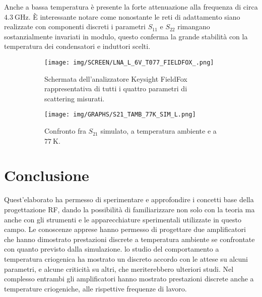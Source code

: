 \documentclass[12pt,oneside]{book}
\begin{document}
Anche a bassa temperatura è presente la forte attenuazione alla frequenza di circa $\SI{4.3}{\giga\hertz}$. È interessante notare come nonostante le reti di adattamento siano realizzate con componenti discreti i parametri $S_{11}$ e $S_{22}$ rimangano sostanzialmente invariati in modulo, questo conferma la grande stabilità con la temperatura dei condensatori e induttori scelti.

\begin{figure}[!htbp]
    \centering
    \begin{subfigure}[t]{0.48\textwidth}
        \centering
        \texttt{[image: img/SCREEN/LNA\_L\_6V\_T077\_FIELDFOX\_.png]}
        \caption{Schermata dell'analizzatore Keysight FieldFox rappresentativa di tutti i quattro parametri di scattering misurati.}
    \end{subfigure}
    \hfill
    \begin{subfigure}[t]{0.48\textwidth}
        \centering
        \texttt{[image: img/GRAPHS/S21\_TAMB\_77K\_SIM\_L.png]}
        \caption{Confronto fra $S_{21}$ simulato, a temperatura ambiente e a $\SI{77}{\kelvin}$.}
    \end{subfigure}
    \caption{}
    \label{cryo_l}
\end{figure}


\chapter{Conclusione}
Quest'elaborato ha permesso di sperimentare e approfondire i concetti base della progettazione RF, dando la possibilità di familiarizzare non solo con la teoria ma anche con gli strumenti e le apparecchiature sperimentali utilizzate in questo campo.
Le conoscenze apprese hanno permesso di progettare due amplificatori che hanno dimostrato prestazioni discrete a temperatura ambiente se confrontate con quanto previsto dalla simulazione. lo studio del comportamento a temperatura criogenica ha mostrato un discreto accordo con le attese su alcuni parametri, e alcune criticità su altri, che meriterebbero ulteriori studi. Nel complesso entrambi gli amplificatori hanno mostrato prestazioni discrete anche a temperature criogeniche, alle rispettive frequenze di lavoro.



\nocite{*}

\end{document}
